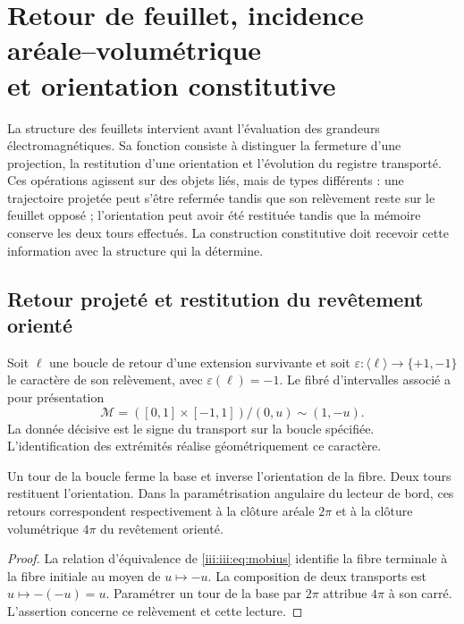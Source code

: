 \section[Retour de feuillet, incidence aréale--volumétrique et orientation constitutive]{Retour de feuillet, incidence aréale--volumétrique\\et orientation constitutive}
\label{iii:iii:sec:hojas}

La structure des feuillets intervient avant l’évaluation des grandeurs
électromagnétiques. Sa fonction consiste à distinguer la fermeture d’une projection,
la restitution d’une orientation et l’évolution du registre transporté.
Ces opérations agissent sur des objets liés, mais de types différents : une
trajectoire projetée peut s’être refermée tandis que son relèvement reste
sur le feuillet opposé ; l’orientation peut avoir été restituée tandis que la mémoire
conserve les deux tours effectués. La construction constitutive doit recevoir
cette information avec la structure qui la détermine.

\subsection{Retour projeté et restitution du revêtement orienté}

Soit $\ell$ une boucle de retour d’une extension survivante et soit
$\varepsilon:\langle\ell\rangle\to\{+1,-1\}$ le caractère de son
relèvement, avec $\varepsilon(\ell)=-1$. Le fibré d’intervalles associé
a pour présentation
\begin{equation}
 \mathcal M=([0,1]\times[-1,1])/{(0,u)\sim(1,-u)}.
 \label{iii:iii:eq:mobius}
\end{equation}
La donnée décisive est le signe du transport sur la boucle spécifiée.
L’identification des extrémités réalise géométriquement ce caractère.

\begin{proposition}
Un tour de la boucle ferme la base et inverse l’orientation de la fibre. Deux
tours restituent l’orientation. Dans la paramétrisation angulaire du lecteur de
bord, ces retours correspondent respectivement à la clôture aréale $2\pi$ et
à la clôture volumétrique $4\pi$ du revêtement orienté.
\end{proposition}
\begin{proof}
La relation d’équivalence de \eqref{iii:iii:eq:mobius} identifie la fibre terminale
à la fibre initiale au moyen de $u\mapsto-u$. La composition de deux transports est
$u\mapsto-(-u)=u$. Paramétrer un tour de la base par $2\pi$ attribue $4\pi$
à son carré. L’assertion concerne ce relèvement et cette lecture.
\end{proof}

